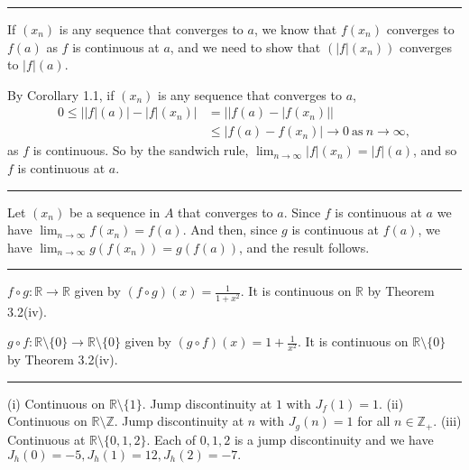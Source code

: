 \documentclass[letterpaper,10pt,english]{jupyterBook}
\begin{document}
\bigskip\hrule\bigskip


\sphinxAtStartPar
{\hyperref[\detokenize{Problems:id14}]{}} If \((x_{n})\) is any sequence that converges to \(a\), we know that \(f(x_n)\) converges to \(f(a)\) as \(f\) is continuous at \(a\), and
we need to show that \((|f|(x_n))\) converges to \(|f|(a)\).

By Corollary 1.1, if \((x_{n})\) is any sequence that converges to \(a\),
\begin{align*}
0 \leq ||f|(a)| -|f|(x_{n})| &= ||f(a) - |f(x_{n})|| \\
&\leq |f(a) - f(x_{n})| \rightarrow 0~\mbox{as}~n \rightarrow \infty, 
\end{align*}
\sphinxAtStartPar
as \(f\) is continuous. So by the sandwich rule, \(\lim_{n\rightarrow\infty} |f|(x_{n}) = |f|(a)\), and so \(f\) is continuous at \(a\).


\bigskip\hrule\bigskip


\sphinxAtStartPar
{\hyperref[\detokenize{Problems:id15}]{}} Let \((x_{n})\) be a sequence in \(A\) that converges to \(a\). Since \(f\) is continuous at \(a\) we have \(\lim_{n\rightarrow\infty} f(x_{n}) = f(a)\). And then, since \(g\) is continuous at \(f(a)\), we have \(\lim_{n\rightarrow\infty} g(f(x_{n})) = g(f(a))\), and the result follows.


\bigskip\hrule\bigskip


\sphinxAtStartPar
{\hyperref[\detokenize{Problems:id16}]{}} \(f \circ g:\mathbb{R}\to \mathbb{R}\) given by \((f \circ g)(x) = \frac{1}{1  + x^{2}}\). It is continuous on \(\mathbb{R}\) by Theorem 3.2(iv).

\(g \circ f:\mathbb{R} \setminus \{0\} \to \mathbb{R} \setminus \{0\}\) given by \((g \circ f)(x) = {1  + \frac{1}{x^2}}\). It is continuous on \(\mathbb{R} \setminus \{0\}\) by Theorem 3.2(iv).


\bigskip\hrule\bigskip


\sphinxAtStartPar
{\hyperref[\detokenize{Problems:id17}]{}}
(i) Continuous on \(\mathbb{R} \setminus \{1\}\). Jump discontinuity at \(1\) with \(J_{f}(1) = 1\).
(ii) Continuous on \(\mathbb{R} \setminus \mathbb{Z}\). Jump discontinuity at \(n\) with \(J_{g}(n) = 1\) for all \(n\in\mathbb{Z}_+\).
(iii) Continuous at \(\mathbb{R} \setminus \{0,1,2\}\). Each of \(0, 1, 2\) is a jump discontinuity and we have \(J_{h}(0) =-5, J_{h}(1) = 12, J_{h}(2) = -7.\)
\end{document}
